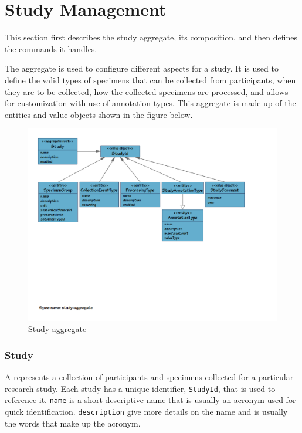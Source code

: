 \chapter{Study Management}

This section first describes the study aggregate, its composition, and then
defines the commands it handles.

The  aggregate is used to configure different aspects for a
study. It is used to define the valid types of specimens that can be collected
from participants, when they are to be collected, how the collected specimens
are processed, and allows for customization with use of annotation types. This
aggregate is made up of the entities and value objects shown in the figure
below.

\begin{figure}[h]
  \includegraphics[trim={9mm 85mm 36mm 9mm}, clip,
    width=1\textwidth]{images/study-aggregate}
  \caption{Study aggregate}
  \label{fig:study-aggregate}
\end{figure}

\subsection*{Study}

A  represents a collection of participants and specimens
collected for a particular research study. Each study has a unique identifier,
\texttt{StudyId}, that is used to reference it. \texttt{name} is a short
descriptive name that is usually an acronym used for quick identification.
\texttt{description} give more details on the name and is usually the words
that make up the acronym.

